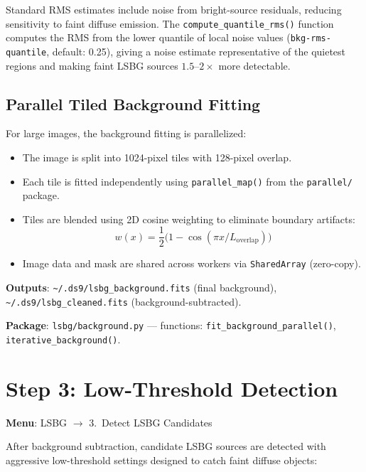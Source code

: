 \documentclass[11pt,fleqn]{book}
\begin{document}
Standard RMS estimates include noise from bright-source residuals, reducing sensitivity to faint diffuse emission.  The \texttt{compute\_quantile\_rms()} function computes the RMS from the lower quantile of local noise values (\texttt{bkg-rms-quantile}, default: 0.25), giving a noise estimate representative of the quietest regions and making faint LSBG sources $1.5\text{--}2\times$ more detectable.

\subsection{Parallel Tiled Background Fitting}

For large images, the background fitting is parallelized:
\begin{itemize}[leftmargin=2em]
  \item The image is split into 1024-pixel tiles with 128-pixel overlap.
  \item Each tile is fitted independently using \texttt{parallel\_map()} from the \texttt{parallel/} package.
  \item Tiles are blended using 2D cosine weighting to eliminate boundary artifacts:
  \begin{equation}
    w(x) = \frac{1}{2}\bigl(1 - \cos(\pi x / L_\mathrm{overlap})\bigr)
  \end{equation}
  \item Image data and mask are shared across workers via \texttt{SharedArray} (zero-copy).
\end{itemize}

\textbf{Outputs}: \texttt{\textasciitilde/.ds9/lsbg\_background.fits} (final background), \texttt{\textasciitilde/.ds9/lsbg\_cleaned.fits} (background-subtracted).

\textbf{Package}: \texttt{lsbg/background.py} --- functions: \texttt{fit\_background\_parallel()}, \texttt{iterative\_background()}.


\section{Step 3: Low-Threshold Detection}
\label{sec:lsbg-detect}

\textbf{Menu}: LSBG $\to$ 3.\ Detect LSBG Candidates

After background subtraction, candidate LSBG sources are detected with aggressive low-threshold settings designed to catch faint diffuse objects:
\end{document}
